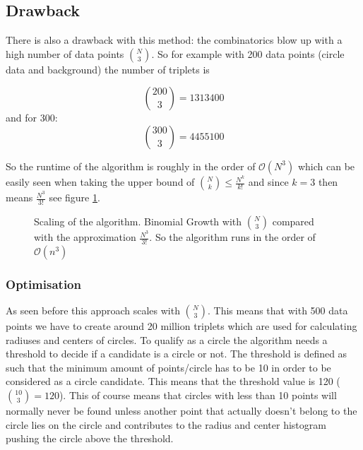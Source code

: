 \documentclass[11pt,twoside]{scrreprt}
\begin{document}
\subsection{Drawback}
	

There is also a drawback with this method: the combinatorics blow up with a high number of data points \( \binom{N}{3} \). So for example with 200 data points (circle data and background) the number of triplets is

\[ \binom{200}{3} = 1313400 \]
and for 300:
\[ \binom{300}{3} = 4455100 \]

So the runtime of the algorithm is roughly in the order of $\mathcal{O}(N^3)$ which can be easily seen when taking the upper bound of $\binom{N}{k} \leq \frac{N^k}{k!}$ and since $k=3$ then means $\frac{N^3}{3!}$ see figure \ref{fig:binom_growth}. 
\begin{figure}[ht]
\centering
    \caption{Scaling of the algorithm. Binomial Growth with $\binom{N}{3}$ compared with the approximation $\frac{N^3}{3!}$. So the algorithm runs in the order of $\mathcal{O}(n^3)$}
  \label{fig:binom_growth}
\end{figure}

\subsubsection{Optimisation} %
\label{ssub:improvement_of_speed}

As seen before this approach scales with $\binom{N}{3}$. This means that with 500 data points we have to create around 20 million triplets which are used for calculating radiuses and centers of circles. 
To qualify as a circle the algorithm needs a threshold to decide if a candidate is a circle or not. The threshold is defined as such that the minimum amount of points/circle has to be 10 in order to be considered as a circle candidate. This means that the threshold value is 120 ($\binom{10}{3}=120$). This of course means that circles with less than 10 points will normally never be found unless another point that actually doesn't belong to the circle lies on the circle and contributes to the radius and center histogram pushing the circle above the threshold.
\end{document}
